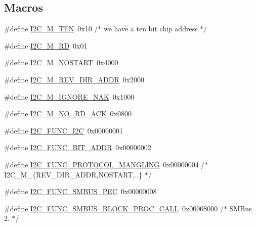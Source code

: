 \subsection*{Macros}
\begin{DoxyCompactItemize}
\item 
\#define \hyperlink{i2c-tools-3_81_81_2include_2linux_2i2c-dev_8h_abe53ff15e0717ccbd1d4c656c09ee53a}{I2\+C\+\_\+\+M\+\_\+\+T\+E\+N}~0x10	/$\ast$ we have a ten bit chip address	$\ast$/
\item 
\#define \hyperlink{i2c-tools-3_81_81_2include_2linux_2i2c-dev_8h_adb8eddbb89e88c4fc0e44306fc878b85}{I2\+C\+\_\+\+M\+\_\+\+R\+D}~0x01
\item 
\#define \hyperlink{i2c-tools-3_81_81_2include_2linux_2i2c-dev_8h_a7a467d37a113d97496f0fa69c6c15650}{I2\+C\+\_\+\+M\+\_\+\+N\+O\+S\+T\+A\+R\+T}~0x4000
\item 
\#define \hyperlink{i2c-tools-3_81_81_2include_2linux_2i2c-dev_8h_a6392dd65e4022a3ed20fc2d7dca3392f}{I2\+C\+\_\+\+M\+\_\+\+R\+E\+V\+\_\+\+D\+I\+R\+\_\+\+A\+D\+D\+R}~0x2000
\item 
\#define \hyperlink{i2c-tools-3_81_81_2include_2linux_2i2c-dev_8h_a0629c50bb05b4c037e726373da50755b}{I2\+C\+\_\+\+M\+\_\+\+I\+G\+N\+O\+R\+E\+\_\+\+N\+A\+K}~0x1000
\item 
\#define \hyperlink{i2c-tools-3_81_81_2include_2linux_2i2c-dev_8h_adb8351c5c02ca2b6909baa9d374ff6d4}{I2\+C\+\_\+\+M\+\_\+\+N\+O\+\_\+\+R\+D\+\_\+\+A\+C\+K}~0x0800
\item 
\#define \hyperlink{i2c-tools-3_81_81_2include_2linux_2i2c-dev_8h_a57a8a5a73f12268825d31bec6184b915}{I2\+C\+\_\+\+F\+U\+N\+C\+\_\+\+I2\+C}~0x00000001
\item 
\#define \hyperlink{i2c-tools-3_81_81_2include_2linux_2i2c-dev_8h_a41ba50f5508feed338fe3181540e1894}{I2\+C\+\_\+\+F\+U\+N\+C\+\_\+B\+I\+T\+\_\+\+A\+D\+D\+R}~0x00000002
\item 
\#define \hyperlink{i2c-tools-3_81_81_2include_2linux_2i2c-dev_8h_af023c6b90cc950f3673e98462ff52a59}{I2\+C\+\_\+\+F\+U\+N\+C\+\_\+\+P\+R\+O\+T\+O\+C\+O\+L\+\_\+\+M\+A\+N\+G\+L\+I\+N\+G}~0x00000004 /$\ast$ I2\+C\+\_\+\+M\+\_\+\{\+R\+E\+V\+\_\+\+D\+I\+R\+\_\+\+A\+D\+D\+R,\+N\+O\+S\+T\+A\+R\+T,..\} $\ast$/
\item 
\#define \hyperlink{i2c-tools-3_81_81_2include_2linux_2i2c-dev_8h_aef3b905e021dbe7aaf98da89c4648764}{I2\+C\+\_\+\+F\+U\+N\+C\+\_\+\+S\+M\+B\+U\+S\+\_\+\+P\+E\+C}~0x00000008
\item 
\#define \hyperlink{i2c-tools-3_81_81_2include_2linux_2i2c-dev_8h_ab98217e0ad04cb3068e159c2de8fd84d}{I2\+C\+\_\+\+F\+U\+N\+C\+\_\+\+S\+M\+B\+U\+S\+\_\+\+B\+L\+O\+C\+K\+\_\+\+P\+R\+O\+C\+\_\+\+C\+A\+L\+L}~0x00008000 /$\ast$ S\+M\+Bus 2. $\ast$/

\end{DoxyCompactItemize}
